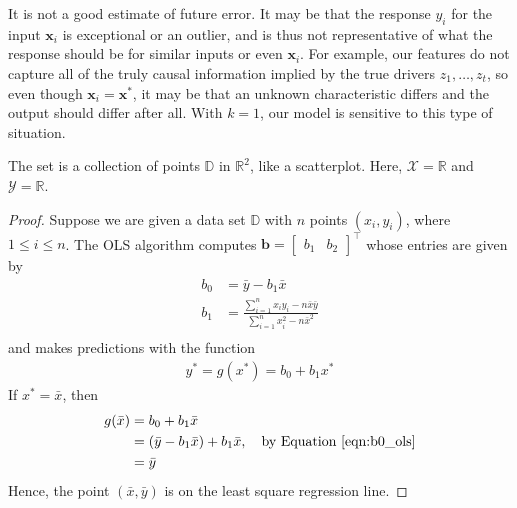 \documentclass[12pt]{article}
\begin{document}
\begin{enumerate}
It is not a good estimate of future error. It may be that the response $y_i$ for the input $\mathbf{x}_i$
is exceptional or an outlier, and is thus not representative of what the response should
be for similar inputs or even $\mathbf{x}_i$. For example, our features do not capture all of
the truly causal information implied by the true drivers $z_1,\ldots,z_t$, so even though
$\mathbf{x}_i=\mathbf{x}^*$, it may be that an unknown characteristic differs and the output
should differ after all. With $k=1$, our model is sensitive to this type of situation.

\end{enumerate}


\begin{enumerate}


The set is a collection of points $\mathbb{D}$ in $\mathbb{R}^2$, like a scatterplot.
Here, $\mathcal{X}=\mathbb{R}$ and $\mathcal{Y}=\mathbb{R}$.



\begin{proof}
	Suppose we are given a data set $\mathbb{D}$ with $n$ points $(x_i,y_i)$,
	where $1\leq i\leq n$. The OLS algorithm computes $\mathbf{b}=\begin{bmatrix}
	b_1 & b_2
	\end{bmatrix}^{\top}$ whose entries are given by
	\begin{align}
		b_0 &= \bar{y} - b_1\bar{x}\label{eqn:b0_ols}\\
		b_1 &= \frac{\sum_{i=1}^{n}x_iy_i - n\bar{x}\bar{y}}{\sum_{i=1}^{n}x_i^2-n\bar{x}^2}
		\label{eqn:b1_ols}\\
	\end{align}
	and makes predictions with the function
	\begin{align*}
		y^* = g(x^*) = b_0 + b_1 x^*
	\end{align*}
	If $x^*=\bar{x}$, then
	\begin{align*}
		g(\bar{x}) &= b_0 + b_1\bar{x}\\
		&=(\bar{y} - b_1 \bar{x}) + b_1 \bar{x},\quad \text{by Equation \ref{eqn:b0_ols}}\\
		&=\bar{y}
	\end{align*}
	Hence, the point $(\bar{x}, \bar{y})$ is on the least square regression line.
\end{proof}


\end{enumerate}
\end{document}
